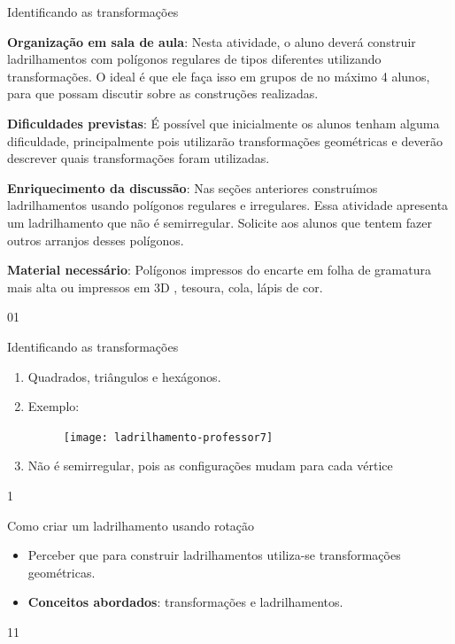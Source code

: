 \begin{sugestions}{Identificando as transformações}
{
	\textbf{Organização em sala de aula}: Nesta atividade, o aluno deverá construir ladrilhamentos com polígonos regulares de tipos diferentes utilizando transformações. O ideal é que ele faça isso em grupos de no máximo 4 alunos, para que possam discutir sobre as construções realizadas. 

	\textbf{Dificuldades previstas}: É possível que inicialmente os alunos tenham alguma dificuldade, principalmente pois utilizarão transformações geométricas e deverão descrever quais transformações foram utilizadas.

	\textbf{Enriquecimento da discussão}: Nas seções anteriores construímos ladrilhamentos usando polígonos regulares e irregulares. Essa atividade apresenta um ladrilhamento que não é semirregular. Solicite aos alunos que tentem fazer outros arranjos desses polígonos.


	\textbf{Material necessário}: Polígonos impressos do encarte em folha de gramatura mais alta ou impressos em 3D , tesoura, cola, lápis de cor.

}{0}{1}
\end{sugestions}
\marginpar{\vspace{\baselineskip}}
\begin{answer}{Identificando as transformações}
{
	\begin{enumerate}
	\item Quadrados, triângulos e hexágonos.
	\item Exemplo:
	\begin{figure}[H]
	\centering
	
	\texttt{[image: ladrilhamento-professor7]}
	\end{figure}
	\item Não é semirregular, pois as configurações mudam para cada vértice
	\end{enumerate}
}{1}
\end{answer}
\begin{objectives}{Como criar um ladrilhamento usando rotação}
{
	\begin{itemize}
	\item Perceber que para construir ladrilhamentos utiliza-se transformações geométricas.
	\item \textbf{Conceitos abordados}: transformações e ladrilhamentos.
	\end{itemize}
}{1}{1}
\end{objectives}
